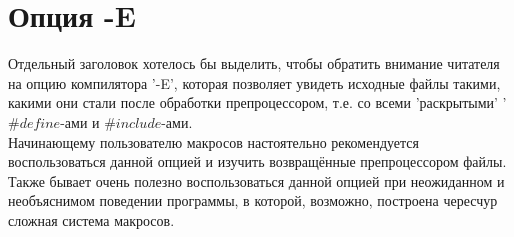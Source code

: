 \documentclass[a4paper]{article}
\begin{document}
\newpage	 
	 
\section{Опция -E}

	Отдельный заголовок хотелось бы выделить, чтобы обратить внимание читателя на опцию компилятора '-E', которая позволяет увидеть исходные файлы такими, какими они стали после обработки препроцессором, т.е. со всеми 'раскрытыми' '$\#define$-ами и $\#include$-ами. \\

	Начинающему пользователю макросов настоятельно рекомендуется воспользоваться данной опцией и изучить возвращённые препроцессором файлы. Также бывает очень полезно воспользоваться данной опцией при неожиданном и необъяснимом поведении программы, в которой, возможно, построена чересчур сложная система макросов.
	
\end{document}
